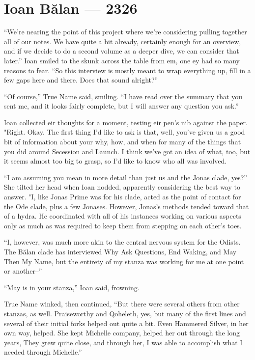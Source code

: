 \hypertarget{ioan-bux103lan-2326}{%
\chapter{Ioan Bălan — 2326}\label{ioan-bux103lan-2326}}

``We're nearing the point of this project where we're considering pulling together all of our notes. We have quite a bit already, certainly enough for an overview, and if we decide to do a second volume as a deeper dive, we can consider that later.'' Ioan smiled to the skunk across the table from em, one ey had so many reasons to fear. ``So this interview is mostly meant to wrap everything up, fill in a few gaps here and there. Does that sound alright?''

``Of course,'' True Name said, smiling. ``I have read over the summary that you sent me, and it looks fairly complete, but I will answer any question you ask.''

Ioan collected eir thoughts for a moment, testing eir pen's nib against the paper. "Right. Okay. The first thing I'd like to ask is that, well, you've given us a good bit of information about your why, how, and when for many of the things that you did around Secession and Launch. I think we've got an idea of what, too, but it seems almost too big to grasp, so I'd like to know who all was involved.

``I am assuming you mean in more detail than just us and the Jonas clade, yes?'' She tilted her head when Ioan nodded, apparently considering the best way to answer. "I, like Jonas Prime was for his clade, acted as the point of contact for the Ode clade, plus a few Jonases. However, Jonas's methods tended toward that of a hydra. He coordinated with all of his instances working on various aspects only as much as was required to keep them from stepping on each other's toes.

``I, however, was much more akin to the central nervous system for the Odists. The Bălan clade has interviewed Why Ask Questions, End Waking, and May Then My Name, but the entirety of my stanza was working for me at one point or another--''

``May is in your stanza,'' Ioan said, frowning.

True Name winked, then continued, ``But there were several others from other stanzas, as well. Praiseworthy and Qoheleth, yes, but many of the first lines and several of their initial forks helped out quite a bit. Even Hammered Silver, in her own way, helped. She kept Michelle company, helped her out through the long years, They grew quite close, and through her, I was able to accomplish what I needed through Michelle.''

